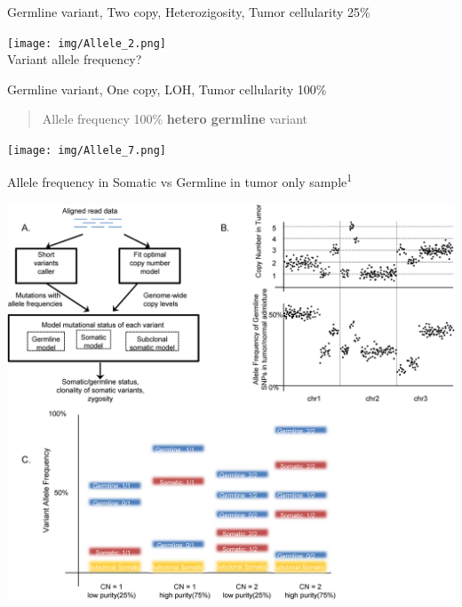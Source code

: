 \documentclass[
  ignorenonframetext,
]{beamer}
\begin{document}
\begin{frame}{Germline variant, Two copy, Heterozigosity, Tumor
cellularity 25\%}
\protect\hypertarget{germline-variant-two-copy-heterozigosity-tumor-cellularity-25}{}

\texttt{[image: img/Allele\_2.png]}\\
Variant allele frequency?

\end{frame}

\begin{frame}{Germline variant, One copy, LOH, Tumor cellularity 100\%}
\protect\hypertarget{germline-variant-one-copy-loh-tumor-cellularity-100}{}

\begin{quote}
Allele frequency 100\% \textbf{hetero germline} variant
\end{quote}

\texttt{[image: img/Allele\_7.png]}

\end{frame}

\begin{frame}{Allele frequency in Somatic vs Germline in tumor only
sample\textsuperscript{1}}
\protect\hypertarget{allele-frequency-in-somatic-vs-germline-in-tumor-only-sample-sun_2018_computational_ploscomputationalbiology}{}

\includegraphics{journal.pcbi.1005965.g001.PNG}

\end{frame}
\end{document}
